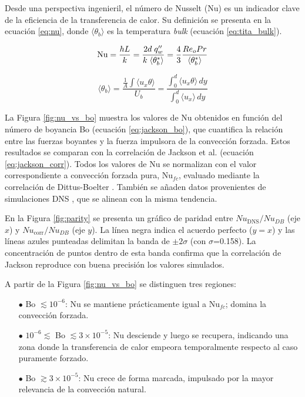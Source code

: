 Desde una perspectiva ingenieril, el número de Nusselt (Nu) es un indicador clave de la eficiencia de la transferencia de calor. Su definición se presenta en la ecuación \ref{eq:nu}, donde $\langle \theta_b \rangle$ es la temperatura \textit{bulk} (ecuación \ref{eq:tita_bulk}).

\begin{equation}
\text{Nu} = \frac{h L}{k} = \frac{2d \hspace*{1mm} q''_w}{k \hspace*{1mm} \langle \theta^*_b \rangle} = \frac{4}{3} \frac{Re_o Pr}{\langle \theta^*_b \rangle}	
\label{eq:nu}
\end{equation}

\begin{equation}
\langle \theta_b \rangle = \frac{\frac{1}{A} \int \langle u_x \theta \rangle }{U_b} = \frac{\int_0^d \langle u_x \theta \rangle \, dy}{\int_0^d \langle u_x \rangle \, dy}
\label{eq:tita_bulk}
\end{equation}

La Figura \ref{fig:nu_vs_bo} muestra los valores de Nu obtenidos en función del número de boyancia Bo (ecuación \ref{eq:jackson_bo}), que cuantifica la relación entre las fuerzas boyantes y la fuerza impulsora de la convección forzada. Estos resultados se comparan con la correlación de Jackson et al. \cite{jackson1989studies} (ecuación \ref{eq:jackson_corr}). Todos los valores de Nu se normalizan con el valor correspondiente a convección forzada pura, Nu$_{fc}$, evaluado mediante la correlación de Dittus-Boelter \cite{incropera}. También se añaden datos provenientes de simulaciones DNS \cite{you2003direct}, que se alinean con la misma tendencia.

En la Figura \ref{fig:parity} se presenta un gráfico de paridad entre $Nu_{\text{DNS}}/Nu_{DB}$ (eje $x$) y $Nu_{\text{corr}}/Nu_{DB}$ (eje $y$). La línea negra indica el acuerdo perfecto ($y=x$) y las líneas azules punteadas delimitan la banda de $\pm2\sigma$ (con $\sigma$=0.158). La concentración de puntos dentro de esta banda confirma que la correlación de Jackson reproduce con buena precisión los valores simulados.

A partir de la Figura \ref{fig:nu_vs_bo} se distinguen tres regiones:

\begin{itemize}
  \item[$\bullet$] Bo $\lesssim 10^{-6}$: Nu se mantiene prácticamente igual a Nu$_{fc}$; domina la convección forzada.
  \item[$\bullet$] $10^{-6} \lesssim$ Bo $\lesssim 3 \times 10^{-5}$: Nu desciende y luego se recupera, indicando una zona donde la transferencia de calor empeora temporalmente respecto al caso puramente forzado.
  \item[$\bullet$] Bo $\gtrsim 3 \times 10^{-5}$: Nu crece de forma marcada, impulsado por la mayor relevancia de la convección natural.
\end{itemize}

